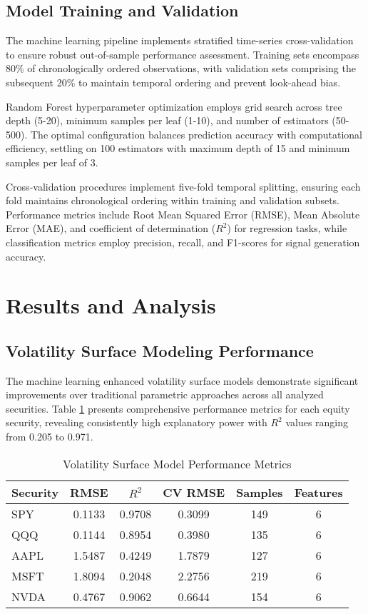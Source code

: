 \documentclass[12pt,a4paper]{article}
\begin{document}
\subsection{Model Training and Validation}

The machine learning pipeline implements stratified time-series cross-validation to ensure robust out-of-sample performance assessment. Training sets encompass 80\% of chronologically ordered observations, with validation sets comprising the subsequent 20\% to maintain temporal ordering and prevent look-ahead bias.

Random Forest hyperparameter optimization employs grid search across tree depth (5-20), minimum samples per leaf (1-10), and number of estimators (50-500). The optimal configuration balances prediction accuracy with computational efficiency, settling on 100 estimators with maximum depth of 15 and minimum samples per leaf of 3.

Cross-validation procedures implement five-fold temporal splitting, ensuring each fold maintains chronological ordering within training and validation subsets. Performance metrics include Root Mean Squared Error (RMSE), Mean Absolute Error (MAE), and coefficient of determination ($R^2$) for regression tasks, while classification metrics employ precision, recall, and F1-scores for signal generation accuracy.

\section{Results and Analysis}

\subsection{Volatility Surface Modeling Performance}

The machine learning enhanced volatility surface models demonstrate significant improvements over traditional parametric approaches across all analyzed securities. Table \ref{tab:model_performance} presents comprehensive performance metrics for each equity security, revealing consistently high explanatory power with $R^2$ values ranging from 0.205 to 0.971.

\begin{table}[H]
\centering
\caption{Volatility Surface Model Performance Metrics}
\label{tab:model_performance}
\begin{tabular}{lccccc}
\toprule
\textbf{Security} & \textbf{RMSE} & \textbf{$R^2$} & \textbf{CV RMSE} & \textbf{Samples} & \textbf{Features} \\
\midrule
SPY & 0.1133 & 0.9708 & 0.3099 & 149 & 6 \\
QQQ & 0.1144 & 0.8954 & 0.3980 & 135 & 6 \\
AAPL & 1.5487 & 0.4249 & 1.7879 & 127 & 6 \\
MSFT & 1.8094 & 0.2048 & 2.2756 & 219 & 6 \\
NVDA & 0.4767 & 0.9062 & 0.6644 & 154 & 6 \\
\bottomrule
\end{tabular}
\end{table}
\end{document}
